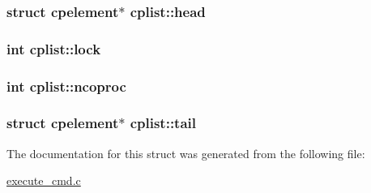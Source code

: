 \subsubsection[{\texorpdfstring{head}{head}}]{\setlength{\rightskip}{0pt plus 5cm}struct {\bf cpelement}$\ast$ cplist\+::head}\hypertarget{structcplist_a0dbec638f97dd68d63b04c47de978763}{}\label{structcplist_a0dbec638f97dd68d63b04c47de978763}
\subsubsection[{\texorpdfstring{lock}{lock}}]{\setlength{\rightskip}{0pt plus 5cm}int cplist\+::lock}\hypertarget{structcplist_aa737a27d76b31857c0d7024665731a68}{}\label{structcplist_aa737a27d76b31857c0d7024665731a68}
\subsubsection[{\texorpdfstring{ncoproc}{ncoproc}}]{\setlength{\rightskip}{0pt plus 5cm}int cplist\+::ncoproc}\hypertarget{structcplist_aafa9e610a74bb2edf40e2f227f03928d}{}\label{structcplist_aafa9e610a74bb2edf40e2f227f03928d}
\subsubsection[{\texorpdfstring{tail}{tail}}]{\setlength{\rightskip}{0pt plus 5cm}struct {\bf cpelement}$\ast$ cplist\+::tail}\hypertarget{structcplist_afea07987e8c9d05612ab196a2eac3514}{}\label{structcplist_afea07987e8c9d05612ab196a2eac3514}


The documentation for this struct was generated from the following file\+:\begin{DoxyCompactItemize}
\item 
\hyperlink{execute__cmd_8c}{execute\+\_\+cmd.\+c}\end{DoxyCompactItemize}

